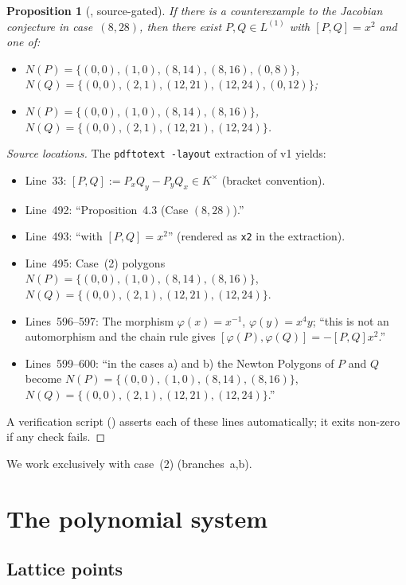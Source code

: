 \documentclass[a4paper,11pt]{article}
\newcommand{\filename}[1]{\texttt{\seqsplit{#1}}}
\theoremstyle{plain}
\newtheorem{proposition}[theorem]{Proposition}
\theoremstyle{definition}
\theoremstyle{remark}
\begin{document}
\begin{proposition}[{\cite[Proposition~4.3]{GGHV}, source-gated}]\label{prop:gghv43}
If there is a counterexample to the Jacobian conjecture in case~$(8,28)$, then there exist $P,Q\in L^{(1)}$ with $[P,Q]=x^2$ and one of:
\begin{itemize}[nosep]
\item[(1)] $N(P)=\{(0,0),(1,0),(8,14),(8,16),(0,8)\}$,\\
$N(Q)=\{(0,0),(2,1),(12,21),(12,24),(0,12)\}$;
\item[(2)] $N(P)=\{(0,0),(1,0),(8,14),(8,16)\}$,\\
$N(Q)=\{(0,0),(2,1),(12,21),(12,24)\}$.
\end{itemize}
\end{proposition}

\begin{proof}[Source locations]
The \texttt{pdftotext -layout} extraction of v1 yields:
\begin{itemize}[nosep]
\item Line~33: $[P,Q]:=P_xQ_y-P_yQ_x\in K^\times$ (bracket convention).
\item Line~492: ``Proposition~4.3 (Case $(8,28)$).''
\item Line~493: ``with $[P,Q]=x^2$'' (rendered as \texttt{x2} in the extraction).
\item Line~495: Case~(2) polygons\\
$N(P)=\{(0,0),(1,0),(8,14),(8,16)\}$, $N(Q)=\{(0,0),(2,1),(12,21),(12,24)\}$.
\item Lines~596--597: The morphism $\varphi(x)=x^{-1}$, $\varphi(y)=x^4y$; ``this is not an automorphism and the chain rule gives $[\varphi(P),\varphi(Q)]=-[P,Q]x^2$.''
\item Lines~599--600: ``in the cases a) and b) the Newton Polygons of $P$ and $Q$ become $N(P)=\{(0,0),(1,0),(8,14),(8,16)\}$, $N(Q)=\{(0,0),(2,1),(12,21),(12,24)\}$.''
\end{itemize}
A verification script (\filename{source\_gate\_verify.py}) asserts each of these lines automatically; it exits non-zero if any check fails.
\end{proof}

We work exclusively with case~(2) (branches~a,b).

\section{The polynomial system}\label{sec:system}

\subsection{Lattice points}
\end{document}
